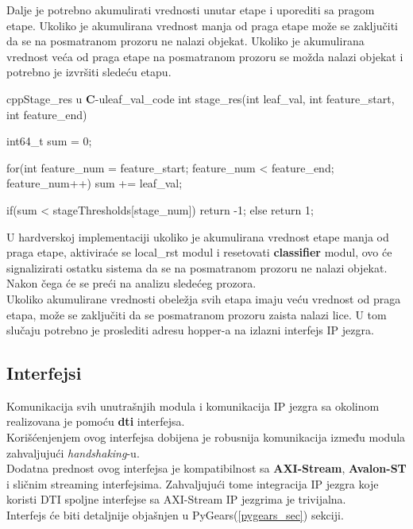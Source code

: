 Dalje je potrebno akumulirati vrednosti unutar etape i uporediti sa pragom
etape.
Ukoliko je akumulirana vrednost manja od praga etape može se zaključiti da se na
posmatranom prozoru ne nalazi objekat.
Ukoliko je akumulirana vrednost veća od praga etape na posmatranom prozoru se
možda nalazi objekat i potrebno je izvršiti sledeću etapu. \\

\newpage
\begin{code}[H]{cpp}{Stage\_res u \textbf{C}-u}{leaf_val_code}
int stage_res(int leaf_val,
              int feature_start,
              int feature_end){
  int64_t sum = 0;

  for(int feature_num = feature_start;
      feature_num < feature_end;
      feature_num++){
    sum += leaf_val;
  }

  if(sum < stageThresholds[stage_num]) return -1;
  else return 1;
}
\end{code}

U hardverskoj implementaciji ukoliko je akumulirana vrednost etape manja od
praga etape, aktiviraće se local\_rst modul i resetovati \textbf{classifier}
modul, ovo će signalizirati ostatku sistema da se na posmatranom prozoru ne
nalazi objekat.
Nakon čega će se preći na analizu sledećeg prozora.\\
Ukoliko akumulirane vrednosti obeležja svih etapa imaju veću vrednost od
praga etapa, može se zaključiti da se posmatranom prozoru zaista nalazi lice.
U tom slučaju potrebno je proslediti adresu hopper-a na izlazni interfejs IP
jezgra. \\

\subsection{Interfejsi}

Komunikacija svih unutrašnjih modula i komunikacija IP jezgra sa okolinom
realizovana je pomoću \textbf{\gls{dti}}\cite{PyGears_OSDA} interfejsa. \\
Korišćenjenjem ovog interfejsa dobijena je robusnija komunikacija između
modula zahvaljujući \emph{handshaking}-u. \\

Dodatna prednost ovog interfejsa je kompatibilnost sa \textbf{AXI-Stream}\cite{AXI_INTF}, \textbf{Avalon-ST}\cite{AVALON_INTF}
i sličnim streaming interfejsima.
Zahvaljujući tome integracija IP jezgra koje koristi DTI spoljne interfejse sa
AXI-Stream IP jezgrima je trivijalna. \\

Interfejs će biti detaljnije objašnjen u PyGears(\ref{pygears_sec}) sekciji.